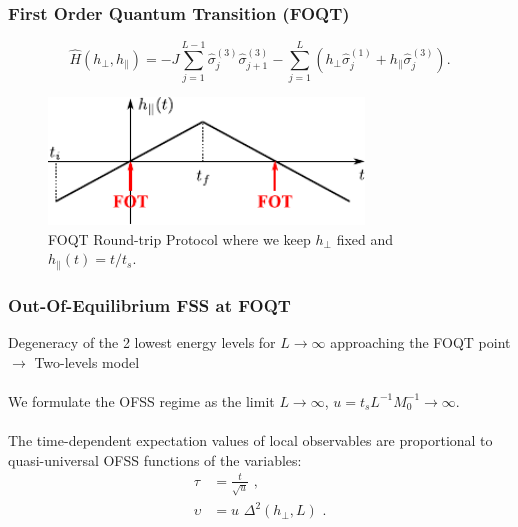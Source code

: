 \begin{frame}
	\frametitle{First Order Quantum Transition (FOQT)}

    \begin{equation}
        \label{eq:model}
        \hat{H}(h_\perp,h_\parallel)=-J\sum_{j=1}^{L-1} \hat\sigma^{(3)}_j\hat\sigma^{(3)}_{j+1} -\sum_{j=1}^L (h_\perp\hat\sigma^{(1)}_j + h_\parallel \hat\sigma^{(3)}_j).   
    \end{equation}
        
    \begin{center}
		\begin{figure}
					   \includegraphics[width=8.4cm]{paper/protocol_foqt.pdf}
					  \caption{ FOQT Round-trip Protocol where we keep $h_\perp$ fixed and $h_\parallel (t) = t / t_s$.}
					\label{protocol_foqt}
		\end{figure}
	\end{center}
	
	
	
\end{frame}

\begin{frame}
    \frametitle{Out-Of-Equilibrium FSS at FOQT }

    Degeneracy of the 2 lowest energy levels for $L\to \infty$ approaching the FOQT point $\longrightarrow$ Two-levels model\\
    $ $\\

    We formulate the OFSS regime as the limit $L \to \infty$, $u = t_s L^{-1} M_0^{-1} \to \infty$.\\
    $ $\\
    The time-dependent expectation values of local observables are proportional to quasi-universal OFSS functions of the variables:
    \begin{align}
        \tau &= \frac{t}{\sqrt{u}} \,\,,\\
        \upsilon &= u \,\,\Delta^2(h_\perp, L) \,\,. 
    \end{align}

\end{frame}

